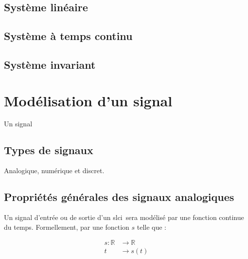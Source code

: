 \subsection{Système linéaire}

\subsection{Système à temps continu}

\subsection{Système invariant}

\section{Modélisation d'un signal}
Un signal 


\subsection{Types de signaux}
\acpl
Analogique, numérique et discret.
\subsection{Propriétés générales des signaux analogiques}

Un signal d'entrée ou de sortie d'un \gls{slci}~sera modélisé par 
une fonction continue du temps. Formellement, par une fonction $s$ telle que :

\begin{align*}
	s : \mathbb{R}&\rightarrow\mathbb{R} \\
t&\rightarrow s(t) 
\end{align*}

